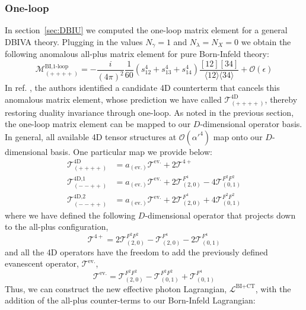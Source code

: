 \documentclass[11pt,letter]{article}
\def\sect#1{section~\ref{#1}}
\begin{document}
\subsubsection{One-loop}\label{sec:Anomalies1loop}
In \sect{sec:DBIU} we computed the one-loop matrix element for a general DBIVA theory. Plugging in the values $N_{\gamma}=1$ and $N_\lambda = N_X = 0$ we obtain the following anomalous all-plus matrix element for pure Born-Infeld theory:
\begin{equation}
\mathcal{M}^{\text{BI,1-loop}}_{(++++)} = -\frac{i}{(4\pi)^2}\frac{1}{60}(s_{12}^4+s_{13}^4+s_{14}^4)\frac{[12][34]}{\langle12\rangle\langle 34\rangle}+\mathcal{O}(\epsilon)
\end{equation}
In ref. \cite{Elvang:2020kuj}, the authors identified a candidate 4D counterterm that cancels this anomalous matrix element, whose prediction we have called $\mathcal{T}^{\text{4D}}_{(++++)}$, thereby restoring duality invariance through one-loop. As noted in the previous section, the one-loop matrix element can be mapped to our $D$-dimensional operator basis. In general, all available 4D tensor structures at $\mathcal{O}(\alpha'^4)$ map onto our $D$-dimensional basis. One particular map we provide below:
\begin{align}
\mathcal{T}^{\text{4D}}_{(++++)} &=  a_{({\text{ev.}})}\mathcal{T}^{\text{ev.}}+2\mathcal{T}^{4+}
\\
\mathcal{T}^{\text{4D,1}}_{(--++)} &= a_{({\text{ev.}})}\mathcal{T}^{\text{ev.}}+2\mathcal{T}_{(2,0)}^{F^4}- 4\mathcal{T}_{(0,1)}^{F^2F^2}
\\ 
\mathcal{T}^{4\text{D,}2}_{(--++)} &= a_{({\text{ev.}})}\mathcal{T}^{\text{ev.}}+2\mathcal{T}_{(2,0)}^{F^4}+ 4\mathcal{T}_{(0,1)}^{F^2F^2}
\end{align}
where we have defined the following $D$-dimensional operator that projects down to the all-plus configuration,
\begin{equation}
\mathcal{T}^{4+}= 2 \mathcal{T}_{(2,0)}^{F^2F^2}-\mathcal{T}_{(2,0)}^{F^4}-2\mathcal{T}_{(0,1)}^{F^4}
\end{equation}
and all the 4D operators have the freedom to add the previously defined evanescent operator, $\mathcal{T}^{\text{ev.}}$, 
\begin{equation}
\mathcal{T}^{\text{ev.}} = \mathcal{T}_{(2,0)}^{F^2F^2}-\mathcal{T}_{(0,1)}^{F^2F^2} + \mathcal{T}_{(0,1)}^{F^4}
\end{equation}
Thus, we can construct the new effective photon Lagrangian, $\mathcal{L}^{\text{BI}+\text{CT}}$, with the addition of the all-plus counter-terms to our Born-Infeld Lagrangian:
\end{document}
